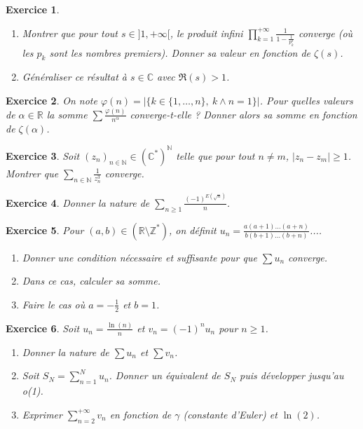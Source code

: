 \documentclass[12pt]{article}
\newtheorem{exercise}{Exercice}[section]
\theoremstyle{remark}
\theoremstyle{remark}
\newcommand{\R}{\mathbb{R}}
\newcommand{\C}{\mathbb{C}}
\newcommand{\N}{\mathbb{N}}
\newcommand{\Z}{\mathbb{Z}}
\begin{document}
\begin{exercise}
	\phantom{}
	\begin{enumerate}
		\item Montrer que pour tout $s\in]1,+\infty[$, le produit infini
		$\prod_{k=1}^{+\infty}\frac{1}{1-\frac{1}{p_{k}^{s}}}$ converge (où les
		$p_{k}$ sont les nombres premiers). Donner sa valeur en fonction de
		$\zeta(s)$.
		\item Généraliser ce résultat à $s\in\C$ avec $\Re(s)>1$.
	\end{enumerate}
\end{exercise}

\begin{exercise}
	On note $\varphi(n)=\vert\{k\in\{1,\dots,n\},~k\wedge n=1\}\vert$. Pour quelles
	valeurs de $\alpha\in\R$ la somme $\sum \frac{\varphi(n)}{n^{\alpha}}$
	converge-t-elle ? Donner alors sa somme en fonction de $\zeta(\alpha)$.
\end{exercise}

\begin{exercise}
	Soit $(z_{n})_{n\in\N}\in(\C^{*})^{\N}$ telle que pour tout $n\neq m$,
	$\vert z_{n}-z_{m}\vert\geqslant1$. Montrer que
	$\sum_{n\in\N}\frac{1}{z_{n}^{3}}$ converge.
\end{exercise}

\begin{exercise}
	Donner la nature de $\sum_{n\geqslant1}\frac{(-1)^{E(\sqrt{n})}}{n}$.
\end{exercise}

\begin{exercise}
	Pour $(a,b)\in(\R\setminus\Z^{*})$, on définit
	$u_{n}=\frac{a(a+1)\dots(a+n)}{b(b+1)\dots(b+n)}$....
	\begin{enumerate}
		\item Donner une condition nécessaire et suffisante pour que $\sum
		u_{n}$ converge.
		\item Dans ce cas, calculer sa somme.
		\item Faire le cas où $a=-\frac{1}{2}$ et $b=1$.
	\end{enumerate}
\end{exercise}

\begin{exercise}
	Soit $u_{n}=\frac{\ln(n)}{n}$ et $v_{n}=(-1)^{n}u_{n}$ pour $n\geqslant1$.
	\begin{enumerate}
		\item Donner la nature de $\sum u_{n}$ et $\sum v_{n}$.
		\item Soit $S_{N}=\sum_{n=1}^{N}u_{n}$. Donner un équivalent de $S_{N}$
		puis développer jusqu'au o(1).
		\item Exprimer $\sum_{n=2}^{+\infty}v_{n}$ en fonction de $\gamma$
		(constante d'Euler) et $\ln(2)$.
	\end{enumerate}
\end{exercise}
\end{document}
